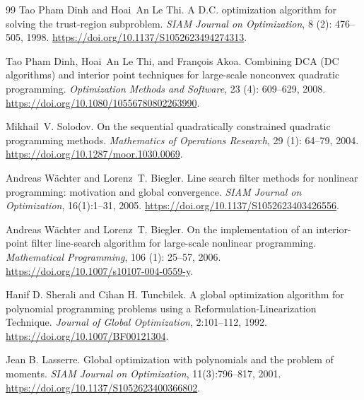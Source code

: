 \documentclass[pdflatex,sn-mathphys-num]{sn-jnl}
\theoremstyle{thmstyleone}
\theoremstyle{thmstylethree}
\newcounter{algorithm}
\begin{document}
\begin{thebibliography}{99}
Tao {Pham Dinh} and Hoai~An {Le Thi}.
\newblock A {D.C.} optimization algorithm for solving the trust-region
  subproblem.
\newblock \emph{SIAM Journal on Optimization}, 8 (2):
  476--505, 1998.
\newblock \url{https://doi.org/10.1137/S1052623494274313}.

Tao {Pham Dinh}, Hoai~An {Le Thi}, and Fran{\c c}ois Akoa.
\newblock Combining {DCA} ({DC} algorithms) and interior point techniques for
  large-scale nonconvex quadratic programming.
\newblock \emph{Optimization Methods and Software}, 23 (4):
  609--629, 2008.
\newblock \url{https://doi.org/10.1080/10556780802263990}.

Mikhail~V. Solodov.
\newblock On the sequential quadratically constrained quadratic programming
  methods.
\newblock \emph{Mathematics of Operations Research}, 29 (1):
  64--79, 2004.
\newblock \url{https://doi.org/10.1287/moor.1030.0069}.

Andreas W\"achter and Lorenz~T. Biegler.
\newblock Line search filter methods for nonlinear programming:
  motivation and global convergence.
\newblock \emph{SIAM Journal on Optimization}, 16(1):1--31, 2005.
\newblock \url{https://doi.org/10.1137/S1052623403426556}.

Andreas W{\"a}chter and Lorenz~T. Biegler.
\newblock On the implementation of an interior-point filter line-search
  algorithm for large-scale nonlinear programming.
\newblock \emph{Mathematical Programming}, 106 (1): 25--57,
  2006.
\newblock \url{https://doi.org/10.1007/s10107-004-0559-y}.

Hanif D. Sherali and Cihan H. Tuncbilek.
\newblock A global optimization algorithm for polynomial programming problems using a Reformulation-Linearization Technique.
\newblock \emph{Journal of Global Optimization}, 2:101--112, 1992.
\newblock \url{https://doi.org/10.1007/BF00121304}.

Jean B. Lasserre.
\newblock Global optimization with polynomials and the problem of moments.
\newblock \emph{SIAM Journal on Optimization}, 11(3):796--817, 2001.
\newblock \url{https://doi.org/10.1137/S1052623400366802}.


\end{thebibliography}
\end{document}
